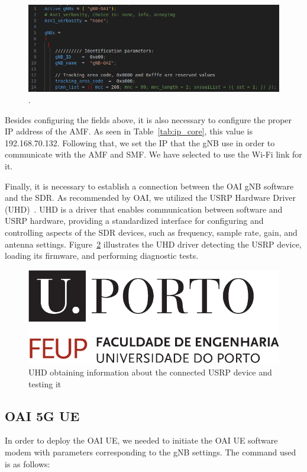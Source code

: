 \begin{figure}[H]
    \centering
    \includegraphics[width=0.7\linewidth]{figures/gnb_conf}
    \caption{.}
    \label{fig:gnb_conf}
\end{figure}

Besides configuring the fields above, it is also necessary to configure the proper IP address of the AMF\@.
As seen in Table~\ref{tab:ip_core}, this value is 192.168.70.132.
Following that, we set the IP that the gNB use in order to communicate with the AMF and SMF\@.
We have selected to use the Wi-Fi link for it.


Finally, it is necessary to establish a connection between the OAI gNB software and the SDR\@.
As recommended by OAI, we utilized the USRP Hardware Driver (UHD)~\cite{uhdusrpdriver}.
UHD is a driver that enables communication between software and USRP hardware, providing a standardized interface for configuring and controlling aspects of the SDR devices, such as frequency, sample rate, gain, and antenna settings.
Figure~\ref{fig:uhd_probe} illustrates the UHD driver detecting the USRP device, loading its firmware, and performing diagnostic tests.

\begin{figure}[H]
    \centering
    \includegraphics[width=0.7\linewidth]{figures/uporto-feup}
    \caption{UHD obtaining information about the connected USRP device and testing it}
    \label{fig:uhd_probe}
\end{figure}

\subsection{OAI 5G UE}\label{subsec:oai-5g-ue}
In order to deploy the OAI UE, we needed to initiate the OAI UE software modem with parameters corresponding to the gNB settings.
The command used is as follows:

